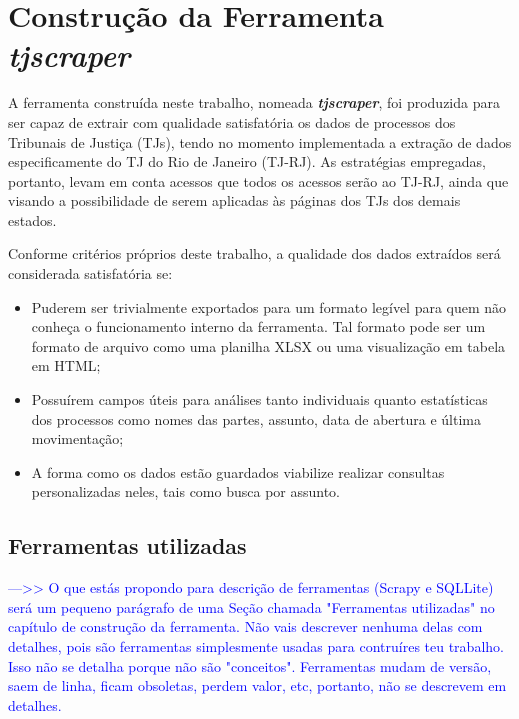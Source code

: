 \chapter{Construção da Ferramenta \textit{tjscraper}~\label{chp:construção-da-ferramenta}}

A ferramenta construída neste trabalho, nomeada \textit{\textbf{tjscraper}},
foi produzida para ser capaz de extrair com qualidade satisfatória os dados de
processos dos Tribunais de Justiça (TJs), tendo no momento implementada a
extração de dados especificamente do TJ do Rio de Janeiro (TJ-RJ). As
estratégias empregadas, portanto, levam em conta acessos que todos os acessos
serão ao TJ-RJ, ainda que visando a possibilidade de serem aplicadas às páginas
dos TJs dos demais estados.

Conforme critérios próprios deste trabalho, a qualidade dos dados extraídos
será considerada satisfatória se:

\begin{itemize}
    \item Puderem ser trivialmente exportados para um formato legível para quem
        não conheça o funcionamento interno da ferramenta. Tal formato pode ser
        um formato de arquivo como uma planilha XLSX ou uma visualização em
        tabela em HTML;
    \item Possuírem campos úteis para análises tanto individuais quanto
        estatísticas dos processos como nomes das partes, assunto, data de
        abertura e última movimentação;
    \item A forma como os dados estão guardados viabilize realizar consultas
        personalizadas neles, tais como busca por assunto.
\end{itemize}

\section{Ferramentas utilizadas~\label{section:ferramentas-utilizadas}}

\textcolor{blue}{--->> O que estás propondo para descrição de ferramentas
(Scrapy e SQLLite) será um pequeno parágrafo de uma Seção chamada "Ferramentas
utilizadas" no capítulo de construção da ferramenta. Não vais descrever nenhuma
delas com detalhes, pois são ferramentas simplesmente usadas para contruíres
teu trabalho. Isso não se detalha porque não são "conceitos". Ferramentas mudam
de versão, saem de linha, ficam obsoletas, perdem valor, etc, portanto, não se
descrevem em detalhes.}

